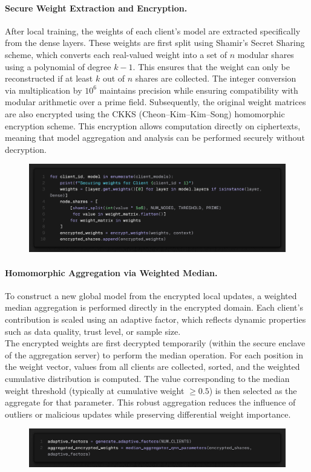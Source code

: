 \documentclass[10pt]{article}
\begin{document}
\paragraph{Secure Weight Extraction and Encryption.}
After local training, the weights of each client's model are extracted specifically from the dense layers. These weights are first split using Shamir’s Secret Sharing scheme, which converts each real-valued weight into a set of $n$ modular shares using a polynomial of degree $k - 1$. This ensures that the weight can only be reconstructed if at least $k$ out of $n$ shares are collected. The integer conversion via multiplication by $10^6$ maintains precision while ensuring compatibility with modular arithmetic over a prime field.
Subsequently, the original weight matrices are also encrypted using the CKKS (Cheon–Kim–Kim–Song) homomorphic encryption scheme. This encryption allows computation directly on ciphertexts, meaning that model aggregation and analysis can be performed securely without decryption.
\begin{figure}[H]
	\centering
	\includegraphics[height = 0.2\textheight]{img/QFL_code/7.png}
\end{figure}


\paragraph{Homomorphic Aggregation via Weighted Median.}
To construct a new global model from the encrypted local updates, a weighted median aggregation is performed directly in the encrypted domain. Each client's contribution is scaled using an adaptive factor, which reflects dynamic properties such as data quality, trust level, or sample size.\\
The encrypted weights are first decrypted temporarily (within the secure enclave of the aggregation server) to perform the median operation. For each position in the weight vector, values from all clients are collected, sorted, and the weighted cumulative distribution is computed. The value corresponding to the median weight threshold (typically at cumulative weight $\geq 0.5$) is then selected as the aggregate for that parameter. This robust aggregation reduces the influence of outliers or malicious updates while preserving differential weight importance.
\begin{figure}[H]
	\centering
	\includegraphics[height = 0.08\textheight]{img/QFL_code/9.png}
\end{figure}
\end{document}
